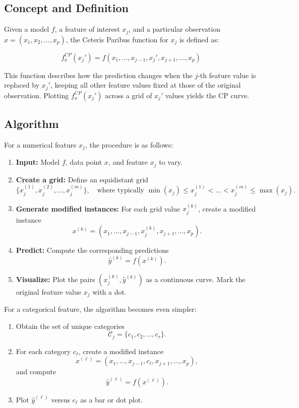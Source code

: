 \subsection{Concept and Definition}

Given a model $f$, a feature of interest $x_j$, and a particular observation $x = (x_1, x_2, \dots, x_p)$, the Ceteris Paribus function for $x_j$ is defined as:

\begin{equation}
f^{CP}_x(x_j') = f(x_1, \dots, x_{j-1}, x_j', x_{j+1}, \dots, x_p)
\end{equation}

This function describes how the prediction changes when the $j$-th feature value is replaced by $x_j'$, keeping all other feature values fixed at those of the original observation.  
Plotting $f^{CP}_x(x_j')$ across a grid of $x_j'$ values yields the CP curve.

\subsection{Algorithm}

For a numerical feature $x_j$, the procedure is as follows:

\begin{enumerate}
    \item \textbf{Input:} Model $f$, data point $x$, and feature $x_j$ to vary.
    \item \textbf{Create a grid:} Define an equidistant grid 
    \[
    \{ x_j^{(1)}, x_j^{(2)}, \dots, x_j^{(m)} \}, 
    \quad \text{where typically } \min(x_j) \le x_j^{(1)} < \dots < x_j^{(m)} \le \max(x_j).
    \]
    \item \textbf{Generate modified instances:} For each grid value $x_j^{(k)}$, create a modified instance
    \[
    x^{(k)} = (x_1, \dots, x_{j-1}, x_j^{(k)}, x_{j+1}, \dots, x_p).
    \]
    \item \textbf{Predict:} Compute the corresponding predictions 
    \[
    \hat{y}^{(k)} = f(x^{(k)}).
    \]
    \item \textbf{Visualize:} Plot the pairs $(x_j^{(k)}, \hat{y}^{(k)})$ as a continuous curve.  
    Mark the original feature value $x_j$ with a dot.
\end{enumerate}

For a categorical feature, the algorithm becomes even simpler:

\begin{enumerate}
    \item Obtain the set of unique categories 
    \[
    \mathcal{C}_j = \{ c_1, c_2, \dots, c_r \}.
    \]
    \item For each category $c_\ell$, create a modified instance 
    \[
    x^{(\ell)} = (x_1, \dots, x_{j-1}, c_\ell, x_{j+1}, \dots, x_p),
    \]
    and compute 
    \[
    \hat{y}^{(\ell)} = f(x^{(\ell)}).
    \]
    \item Plot $\hat{y}^{(\ell)}$ versus $c_\ell$ as a bar or dot plot.
\end{enumerate}

